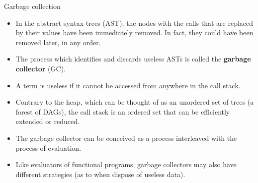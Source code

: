 %
\begin{frame}{Garbage collection}

  \begin{itemize}

    \item In the abstract syntax trees (AST), the nodes with the calls
      that are replaced by their values have been immediately
      removed. In fact, they could have been removed later, in any
      order.

    \item The process which identifies and discards useless ASTs is
      called the \textbf{garbage collector} (GC).

    \item A term is useless if it cannot be accessed from anywhere in
      the call stack.

    \item Contrary to the heap, which can be thought of as an
      unordered set of trees (a forest of DAGs), the call stack is an
      ordered set that can be efficiently extended or reduced.

    \item The garbage collector can be conceived as a process
      interleaved with the process of evaluation.

    \item Like evaluators of functional programs, garbage collectors
      may also have different strategies (as to when dispose of
      useless data).
  \end{itemize}

\end{frame}

